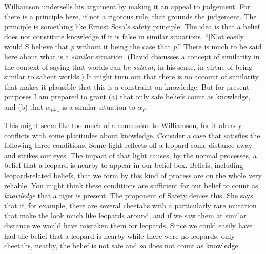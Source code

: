 Williamson undersells his argument by making it an appeal to judgement. For there is a principle here, if not a rigorous rule, that grounds the judgement. The principle is something like Ernest Sosa's safety principle. The idea is that a belief does not constitute knowledge if it is false in similar situations. ``[N]ot easily would S believe that \textit{p} without it being the case that \textit{p}.'' \cite[142]{Sosa1999} There is much to be said here about what is a \textit{similar} situation. (David \citet{Lewis1996b} discusses a concept of similarity in the context of saying that worlds can be \textit{salient}, in his sense, in virtue of being similar to salient worlds.) It might turn out that there is no account of similarity that makes it plausible that this is a constraint on knowledge. But for present purposes I am prepared to grant (a) that only safe beliefs count as knowledge, and (b) that ${\alpha}$\textit{\textsubscript{i}}\textsubscript{+1} is a similar situation to ${\alpha}$\textit{\textsubscript{i}}. 

This might seem like too much of a concession to Williamson, for it already conflicts with some platitudes about knowledge. Consider a case that satisfies the following three conditions. Some light reflects off a leopard some distance away and strikes our eyes. The impact of that light causes, by the normal processes, a belief that a leopard is nearby to appear in our belief box. Beliefs, including leopard-related beliefs, that we form by this kind of process are on the whole very reliable. You might think these conditions are sufficient for our belief to count as \textit{knowledge} that a tiger is present. The proponent of Safety denies this. She says that if, for example, there are several cheetahs with a particularly rare mutation that make the look much like leopards around, and if we saw them at similar distance we would have mistaken them for leopards. Since we could easily have had the belief that a leopard is nearby while there were no leopards, only cheetahs, nearby, the belief is not safe and so does not count as knowledge.

